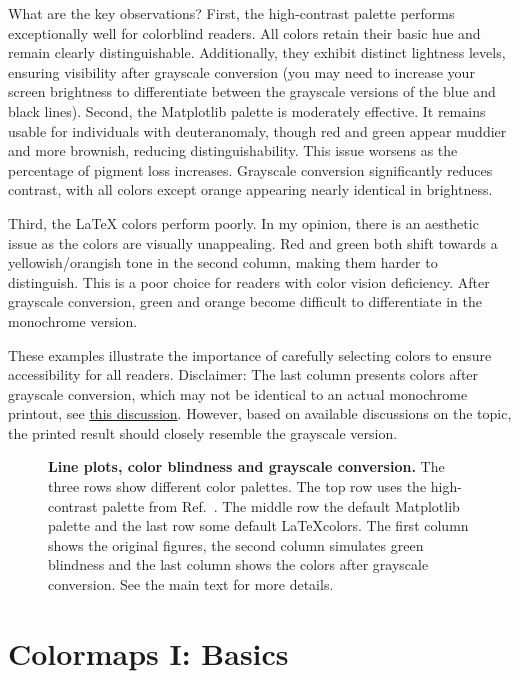 What are the key observations?
First, the high-contrast palette performs exceptionally well for colorblind readers.
All colors retain their basic hue and remain clearly distinguishable. Additionally, they exhibit distinct lightness levels, ensuring visibility after grayscale conversion (you may need to increase your screen brightness to differentiate between the grayscale versions of the blue and black lines).
Second, the Matplotlib palette is moderately effective. It remains usable for individuals with deuteranomaly, though red and green appear muddier and more brownish, reducing distinguishability. This issue worsens as the percentage of pigment loss increases. Grayscale conversion significantly reduces contrast, with all colors except orange appearing nearly identical in brightness.

Third, the LaTeX colors perform poorly. In my opinion, there is an aesthetic issue as the colors are visually unappealing. Red and green both shift towards a yellowish/orangish tone in the second column, making them harder to distinguish. This is a poor choice for readers with color vision deficiency. After grayscale conversion, green and orange become difficult to differentiate in the monochrome version.

These examples illustrate the importance of carefully selecting colors to ensure accessibility for all readers. Disclaimer: The last column presents colors after grayscale conversion, which may not be identical to an actual monochrome printout, see \href{https://1800officesolutions.com/monochrome-vs-grayscale-printing/}{this discussion}. However, based on available discussions on the topic, the printed result should closely resemble the grayscale version.

\begin{figure}
	\centering 
	
	\caption{\textbf{Line plots, color blindness and grayscale conversion.} The three rows show different color palettes. The top row uses the high-contrast palette from Ref.~\cite{paultol}. The middle row the default Matplotlib palette and the last row some default \LaTeX colors. The first column shows the original figures, the second column simulates green blindness and the last column shows the colors after grayscale conversion. See the main text for more details.}
	\label{fig:lineplotcolorblindness}
\end{figure}



\section{Colormaps I: Basics}

